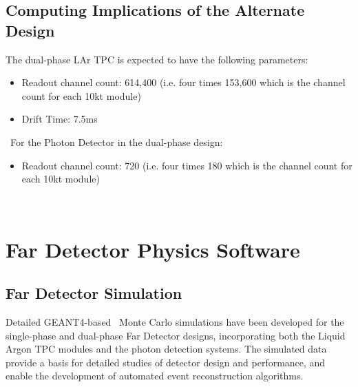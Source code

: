 \subsection{Computing Implications of the Alternate Design}
\label{sec:detectors-sc-alternate}
The dual-phase LAr TPC is expected to have the following parameters:
\begin{itemize}
	\item Readout channel count: 614,400 (i.e. four times 153,600 which is the channel count
	for each 10kt module)
	\item Drift Time: 7.5ms
\end{itemize}
\
For the Photon Detector in the dual-phase design:
\begin{itemize}
	\item Readout channel count: 720 (i.e. four times 180 which is the channel count
	for each 10kt module)
\end{itemize}
\
\section{Far Detector Physics Software}
\label{sec:detectors-sc-physics-software}


\subsection{Far Detector Simulation}
\label{sec:detectors-sc-physics-software-simulation-fd}

Detailed GEANT4-based~\cite{GEANT4:NIM,GEANT4} Monte Carlo simulations have been 
developed for the single-phase and dual-phase Far Detector designs,
incorporating both the Liquid Argon TPC modules
and the photon detection systems. The simulated data provide
a basis for detailed studies of detector design and performance, 
and enable the development of automated event reconstruction algorithms.

